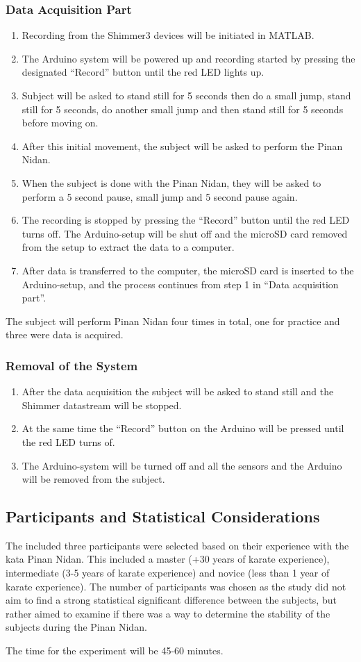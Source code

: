 \subsubsection{Data Acquisition Part}
\begin{enumerate}
\item Recording from the Shimmer3 devices will be initiated in MATLAB.
\item The Arduino system will be powered up and recording started by pressing the designated “Record” button until the red LED lights up.
\item Subject will be asked to stand still for 5 seconds then do a small jump, stand still for 5 seconds, do another small jump and then stand still for 5 seconds before moving on.
\item After this initial movement, the subject will be asked to perform the Pinan Nidan.
\item When the subject is done with the Pinan Nidan, they will be asked to perform a 5 second pause, small jump and 5 second pause again.
\item The recording is stopped by pressing the “Record” button until the red LED turns off. The Arduino-setup will be shut off and the microSD card removed from the setup to extract the data to a computer.
\item After data is transferred to the computer, the microSD card is inserted to the Arduino-setup, and the process continues from step 1 in “Data acquisition part”.
\end{enumerate}

The subject will perform Pinan Nidan four times in total, one for practice and three were data is acquired.

\subsubsection{Removal of the System}
\begin{enumerate}
\item After the data acquisition the subject will be asked to stand still and the Shimmer datastream will be stopped. 
\item At the same time the “Record” button on the Arduino will be pressed until the red LED turns of. 
\item The Arduino-system will be turned off and all the sensors and the Arduino will be removed from the subject.
\end{enumerate}

\subsection{Participants and Statistical Considerations}
The included three participants were selected based on their experience with the kata Pinan Nidan. This included a master (+30 years of karate experience), intermediate (3-5 years of karate experience) and novice (less than 1 year of karate experience). The number of participants was chosen as the study did not aim to find a strong statistical significant difference between the subjects, but rather aimed to examine if there was a way to determine the stability of the subjects during the Pinan Nidan.

The time for the experiment will be 45-60 minutes.
